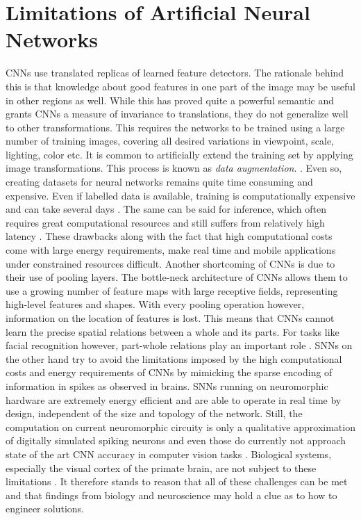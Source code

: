 \section{Limitations of Artificial Neural Networks}\label{section:limitations}
CNNs use translated replicas of learned feature detectors. The rationale behind this is that knowledge about good features in one part of the image may be useful in other regions as well. While this has proved quite a powerful semantic and grants CNNs a measure of invariance to translations, they do not generalize well to other transformations. This requires the networks to be trained using a large number of training images, covering all desired variations in viewpoint, scale, lighting, color etc. It is common to artificially extend the training set by applying image transformations. This process is known as \emph{data augmentation}.  \cite{wong2016understanding,perez2017effectiveness}. Even so, creating datasets for neural networks remains quite time consuming and expensive. Even if labelled data is available, training is computationally expensive and can take several days \cite{Lee:2016:HVC:3012029.3012067,silver2016mastering}. The same can be said for inference, which often requires great computational resources and still suffers from relatively high latency \cite{dong2009high}. These drawbacks along with the fact that high computational costs come with large energy requirements, make real time and mobile applications under constrained resources difficult. Another shortcoming of CNNs is due to their use of pooling layers. The bottle-neck architecture of CNNs allows them to use a growing number of feature maps with large receptive fields, representing high-level features and shapes. With every pooling operation however, information on the location of features is lost. This means that CNNs cannot learn the precise spatial relations between a whole and its parts. For tasks like facial recognition however, part-whole relations play an important role \cite{tanaka2016parts}.
SNNs on the other hand try to avoid the limitations imposed by the high computational costs and energy requirements of CNNs by mimicking the sparse encoding of information in spikes as observed in brains. SNNs running on neuromorphic hardware are extremely energy efficient and are able to operate in real time by design, independent of the size and topology of the network. Still, the computation on current neuromorphic circuity is only a qualitative approximation of digitally simulated spiking neurons and even those do currently not approach state of the art CNN accuracy in computer vision tasks \cite{indiveri2011neuromorphic,diehl2015unsupervised}. Biological systems, especially the visual cortex of the primate brain, are not subject to these limitations \cite{stone2018rotation,isbister2018new}. It therefore stands to reason that all of these challenges can be met and that findings from biology and neuroscience may hold a clue as to how to engineer solutions.

